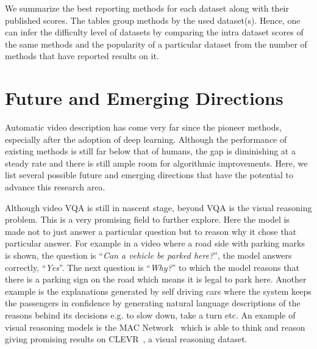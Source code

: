 \documentclass[10pt,journal,compsoc]{IEEEtran}
\begin{document}
We summarize the best reporting methods for each dataset along with their published scores. The tables group methods by the used dataset(s). Hence, one can infer the difficulty level of datasets by comparing the intra dataset scores of the same methods and the popularity of a particular dataset from the number of methods that have reported results on it.



\section{Future and Emerging Directions}
\label{sec:futuredirections}
Automatic video description has come very far since the pioneer methods, especially after the adoption of deep learning. Although the performance of existing methods is still far below that of humans, the gap is diminishing at a steady rate and there is still ample room for algorithmic improvements. Here, we list several possible future and emerging directions that have the potential to advance this research area.


\vspace{2mm}
Although video VQA is still in nascent stage, beyond VQA is the visual reasoning problem. This is a very promising field to further explore. Here the model is made not to just answer a particular question but to reason why it chose that particular answer.  For example in a video where a road side with parking marks is shown, the question is ``\textit{Can a vehicle be parked here?}'', the model answers correctly, ``\textit{Yes}''. The next question is ``\textit{Why?}'' to which the model reasons that there is a parking sign on the road which means it is legal to park here. Another example is the explanations generated by self driving cars \cite{explanable_selfDriving} where the system keeps the passengers in confidence by generating natural language descriptions of the reasons behind its decisions e.g. to slow down, take a turn etc. An example of visual reasoning models is the MAC Network~\cite{macnetreason} which is able to think and reason giving promising results on CLEVR~\cite{cleverreasondataset}, a visual reasoning dataset.

\end{document}
